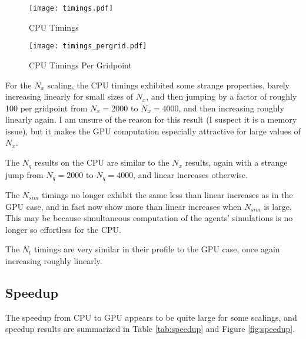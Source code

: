 \documentclass[a4paper,12pt]{article}
\numberwithin{equation}{section}
\theoremstyle{definition}
\begin{document}
\begin{figure}[ht]
  \centering
  \caption{CPU Timings}
  \label{fig:cpu_timings}
  \texttt{[image: timings.pdf]}
\end{figure}

\begin{figure}[ht]
  \centering
  \caption{CPU Timings Per Gridpoint}
  \label{fig:cpu_timings_pergrid}
  \texttt{[image: timings\_pergrid.pdf]}
\end{figure}

For the $N_x$ scaling, the CPU timings exhibited some strange properties, barely increasing linearly for small sizes of $N_x$, and then jumping by a factor of roughly 100 per gridpoint from $N_x = 2000$ to $N_x = 4000$, and then increasing roughly linearly again. I am unsure of the reason for this result (I suspect it is a memory issue), but it makes the GPU computation especially attractive for large values of $N_x$.

The $N_q$ results on the CPU are similar to the $N_x$ results, again with a strange jump from $N_q = 2000$ to $N_q = 4000$, and linear increases otherwise.

The $N_{sim}$ timings no longer exhibit the same less than linear increases as in the GPU case, and in fact now show more than linear increases when $N_{sim}$ is large. This may be because simultaneous computation of the agents' simulations is no longer so effortless for the CPU.

The $N_t$ timings are very similar in their profile to the GPU case, once again increasing roughly linearly.

\subsection{Speedup}

The speedup from CPU to GPU appears to be quite large for some
scalings, and speedup results are summarized in Table
\ref{tab:speedup} and Figure \ref{fig:speedup}.
\end{document}
